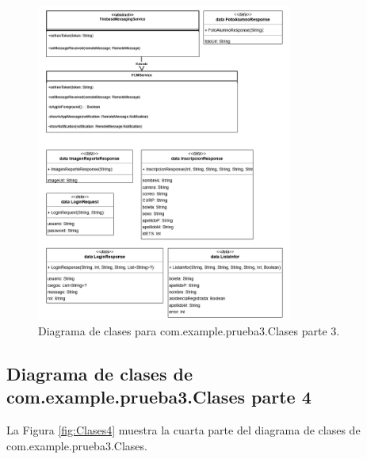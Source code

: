 \begin{figure}[htbp!]
	\begin{center}
		\includegraphics[width=0.75\textwidth]{DiagramasMoviles/DCM (4)}
		\caption{Diagrama de clases para com.example.prueba3.Clases parte 3.}
		\label{fig:Clases3}
	\end{center}
\end{figure}

\newpage

\subsection{Diagrama de clases de com.example.prueba3.Clases parte 4}

La Figura \ref{fig:Clases4} muestra la cuarta parte del diagrama de clases de com.example.prueba3.Clases.

